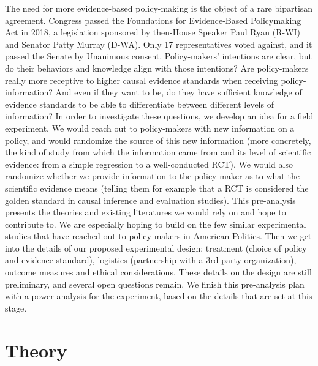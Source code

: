 \documentclass[12pt,final,fleqn]{article}
\theoremstyle{plain}
\begin{document}
The need for more evidence-based policy-making is the object of a rare bipartisan agreement. Congress passed the Foundations for Evidence-Based Policymaking Act in 2018, a legislation sponsored by then-House Speaker Paul Ryan (R-WI) and Senator Patty Murray (D-WA). Only 17 representatives voted against, and it passed the Senate by Unanimous consent. Policy-makers' intentions are clear, but do their behaviors and knowledge align with those intentions? Are policy-makers really more receptive to higher causal evidence standards when receiving policy-information? And even if they want to be, do they have sufficient knowledge of evidence standards to be able to differentiate between different levels of information? In order to investigate these questions, we develop an idea for a field experiment. We would reach out to policy-makers with new information on a policy, and would randomize the source of this new information (more concretely, the kind of study from which the information came from and its level of scientific evidence: from a simple regression to a well-conducted RCT). We would also randomize whether we provide information to the policy-maker as to what the scientific evidence means (telling them for example that a RCT is considered the golden standard in causal inference and evaluation studies). 
\bigbreak
This pre-analysis presents the theories and existing literatures we would rely on and hope to contribute to. We are especially hoping to build on the few similar experimental studies that have reached out to policy-makers in American Politics. Then we get into the details of our proposed experimental design: treatment (choice of policy and evidence standard), logistics (partnership with a 3rd party organization), outcome measures and ethical considerations. These details on the design are still preliminary, and several open questions remain. We finish this pre-analysis plan with a power analysis for the experiment, based on the details that are set at this stage. 


\section{Theory} \label{sec:Theory}
\end{document}
